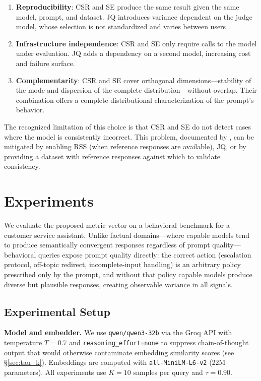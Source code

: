 \documentclass[11pt,a4paper]{article}
\begin{document}
\begin{enumerate}[noitemsep]
    \item \textbf{Reproducibility}: CSR and SE produce the same result given the same model, prompt, and dataset. JQ introduces variance dependent on the judge model, whose selection is not standardized and varies between users \citep{geval2023}.
    \item \textbf{Infrastructure independence}: CSR and SE only require calls to the model under evaluation. JQ adds a dependency on a second model, increasing cost and failure surface.
    \item \textbf{Complementarity}: CSR and SE cover orthogonal dimensions—stability of the mode and dispersion of the complete distribution—without overlap. Their combination offers a complete distributional characterization of the prompt's behavior.
\end{enumerate}

The recognized limitation of this choice is that CSR and SE do not detect cases where the model is consistently incorrect. This problem, documented by \citet{glape2024}, can be mitigated by enabling RSS (when reference responses are available), JQ, or by providing a dataset with reference responses against which to validate consistency.

\section{Experiments}
\label{sec:experiments}

We evaluate the proposed metric vector on a behavioral benchmark for a customer service assistant. Unlike factual domains---where capable models tend to produce semantically convergent responses regardless of prompt quality---behavioral queries expose prompt quality directly: the correct action (escalation protocol, off-topic redirect, incomplete-input handling) is an arbitrary policy prescribed only by the prompt, and without that policy capable models produce diverse but plausible responses, creating observable variance in all signals.

\subsection{Experimental Setup}

\textbf{Model and embedder.} We use \texttt{qwen/qwen3-32b} via the Groq API with temperature $T = 0.7$ and \texttt{reasoning\_effort=none} to suppress chain-of-thought output that would otherwise contaminate embedding similarity scores (see \S\ref{sec:tau_k}). Embeddings are computed with \texttt{all-MiniLM-L6-v2} (22M parameters). All experiments use $K = 10$ samples per query and $\tau = 0.90$.
\end{document}
